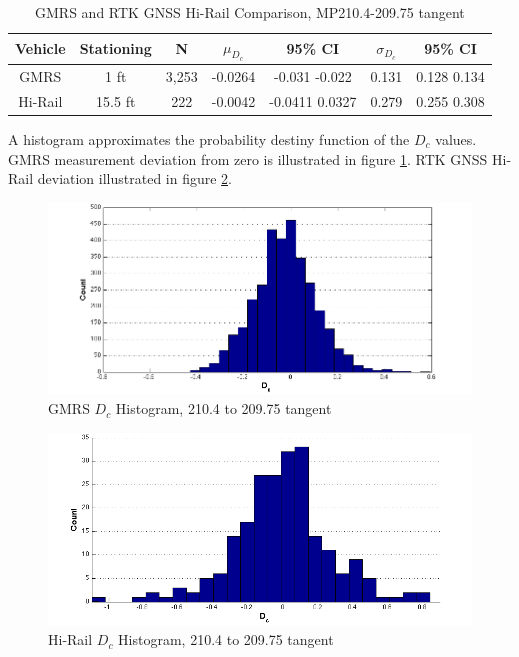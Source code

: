 \begin{table}
\begin{center}
\caption{GMRS and RTK GNSS Hi-Rail Comparison, MP210.4-209.75 tangent}
\label{tab:tanComp}
\begin{tabular}{c c c c c c c}
\toprule
Vehicle&Stationing&N&${\mu}_{D_c}$&95\% CI&${\sigma}_{D_c}$&95\% CI\\
\midrule
GMRS&1 ft     &3,253&-0.0264&  -0.031  -0.022&0.131&   0.128   0.134\\
Hi-Rail&15.5 ft&222   &-0.0042&-0.0411  0.0327&0.279&0.255   0.308\\
\bottomrule
\end{tabular}
\end{center}
\end{table}

A histogram approximates the probability destiny function of the ${D_c}$ values. GMRS measurement deviation from zero is illustrated in figure \ref{gmrs_hist}. RTK GNSS Hi-Rail deviation illustrated in figure \ref{Hi-Rail_hist}.

\begin{figure}[!h]
	\begin{center}
	\includegraphics[scale=0.50]{graphics/GMRS_tanHist}
	\caption{GMRS ${D_c}$ Histogram, 210.4 to 209.75 tangent}
	\label{gmrs_hist}
	\end{center}
\end{figure}

\begin{figure}[!h]
	\begin{center}
	\includegraphics[scale=0.50]{graphics/HiRail_tanHist}
	\caption{Hi-Rail ${D_c}$ Histogram, 210.4 to 209.75 tangent}
	\label{Hi-Rail_hist}
	\end{center}
\end{figure}

